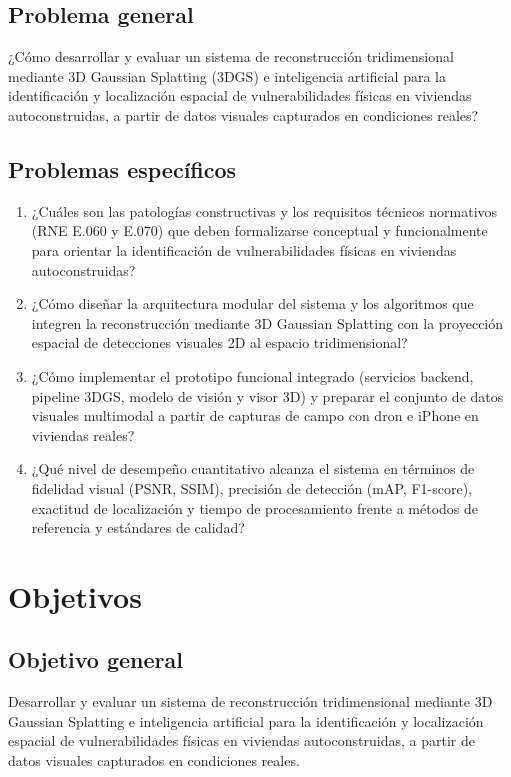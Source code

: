 \documentclass[12pt,oneside]{report}
\begin{document}
\subsection{Problema general}
¿Cómo desarrollar y evaluar un sistema de reconstrucción tridimensional mediante 3D Gaussian Splatting (3DGS) e inteligencia artificial para la identificación y localización espacial de vulnerabilidades físicas en viviendas autoconstruidas, a partir de datos visuales capturados en condiciones reales?

\subsection{Problemas específicos}
\begin{enumerate}
  \item ¿Cuáles son las patologías constructivas y los requisitos técnicos normativos (RNE E.060 y E.070) que deben formalizarse conceptual y funcionalmente para orientar la identificación de vulnerabilidades físicas en viviendas autoconstruidas?
  \item ¿Cómo diseñar la arquitectura modular del sistema y los algoritmos que integren la reconstrucción mediante 3D Gaussian Splatting con la proyección espacial de detecciones visuales 2D al espacio tridimensional?
  \item ¿Cómo implementar el prototipo funcional integrado (servicios backend, pipeline 3DGS, modelo de visión y visor 3D) y preparar el conjunto de datos visuales multimodal a partir de capturas de campo con dron e iPhone en viviendas reales?
  \item ¿Qué nivel de desempeño cuantitativo alcanza el sistema en términos de fidelidad visual (PSNR, SSIM), precisión de detección (mAP, F1-score), exactitud de localización y tiempo de procesamiento frente a métodos de referencia y estándares de calidad?
\end{enumerate}

\clearpage
\section{Objetivos}

\subsection{Objetivo general}
Desarrollar y evaluar un sistema de reconstrucción tridimensional mediante 3D Gaussian Splatting e inteligencia artificial para la identificación y localización espacial de vulnerabilidades físicas en viviendas autoconstruidas, a partir de datos visuales capturados en condiciones reales.
\end{document}
